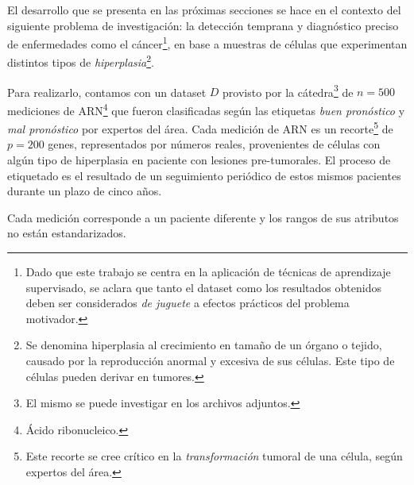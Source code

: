 El desarrollo que se presenta en las próximas secciones se hace en el contexto del siguiente problema de investigación: la detección temprana y diagnóstico preciso de enfermedades como el cáncer\footnote{Dado que este trabajo se centra en la aplicación de técnicas de aprendizaje supervisado, se aclara que tanto el dataset como los resultados obtenidos deben ser considerados \textit{de juguete} a efectos prácticos del problema motivador.}, en base a muestras de células que experimentan distintos tipos de \textit{hiperplasia}\footnote{Se denomina hiperplasia al crecimiento en tamaño de un órgano o tejido, causado por la reproducción anormal y excesiva de sus células. Este tipo de células pueden derivar en tumores.}. 

Para realizarlo, contamos con un dataset $D$ provisto por la cátedra\footnote{El mismo se puede investigar en los archivos adjuntos.} de $n=500$ mediciones de ARN\footnote{Ácido ribonucleico.} que fueron clasificadas según las etiquetas \textit{buen pronóstico} y \textit{mal pronóstico} por expertos del área. Cada medición de ARN es un recorte\footnote{Este recorte se cree crítico en la \textit{transformación} tumoral de una célula, según expertos del área.} de $p=200$ genes, representados por números reales, provenientes de células con algún tipo de hiperplasia en paciente con lesiones pre-tumorales. El proceso de etiquetado es el resultado de un seguimiento periódico de estos mismos pacientes durante un plazo de cinco años.

Cada medición corresponde a un paciente diferente y los rangos de sus atributos no están estandarizados. 